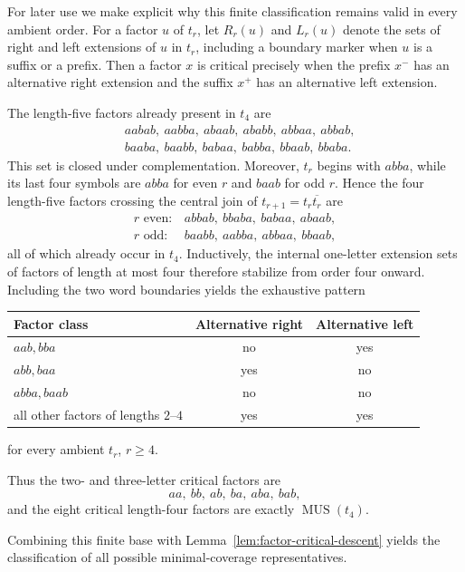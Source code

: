 \documentclass[10pt,a4paper]{article}
\theoremstyle{definition}\newtheorem{definition}[theorem]{Definition}
\theoremstyle{remark}\newtheorem{remark}[theorem]{Remark}
\newcommand{\MUS}{\operatorname{MUS}}
\begin{document}
For later use we make explicit why this finite classification remains valid in every ambient order.  For a factor $u$ of $t_r$, let $R_r(u)$ and $L_r(u)$ denote the sets of right and left extensions of $u$ in $t_r$, including a boundary marker when $u$ is a suffix or a prefix.  Then a factor $x$ is critical precisely when the prefix $x^-$ has an alternative right extension and the suffix $x^+$ has an alternative left extension.

The length-five factors already present in $t_4$ are
\begin{align*}
 &aabab,\ aabba,\ abaab,\ ababb,\ abbaa,\ abbab,\\
 &baaba,\ baabb,\ babaa,\ babba,\ bbaab,\ bbaba.
\end{align*}
This set is closed under complementation.  Moreover, $t_r$ begins with $abba$, while its last four symbols are $abba$ for even $r$ and $baab$ for odd $r$.  Hence the four length-five factors crossing the central join of $t_{r+1}=t_r\overline{t_r}$ are
\[
 \begin{array}{ll}
 r\text{ even}:& abbab,\ bbaba,\ babaa,\ abaab,\\
 r\text{ odd}:& baabb,\ aabba,\ abbaa,\ bbaab,
 \end{array}
\]
all of which already occur in $t_4$.  Inductively, the internal one-letter extension sets of factors of length at most four therefore stabilize from order four onward.  Including the two word boundaries yields the exhaustive pattern
\begin{center}
\begin{tabular}{lcc}
\toprule
Factor class & Alternative right & Alternative left\\
\midrule
$aab,bba$ & no & yes\\
$abb,baa$ & yes & no\\
$abba,baab$ & no & no\\
all other factors of lengths $2$--$4$ & yes & yes\\
\bottomrule
\end{tabular}
\end{center}
for every ambient $t_r$, $r\ge4$.

Thus the two- and three-letter critical factors are
\[
 aa,\ bb,\ ab,\ ba,\ aba,\ bab,
\]
and the eight critical length-four factors are exactly $\MUS(t_4)$.

Combining this finite base with Lemma~\ref{lem:factor-critical-descent} yields the classification of all possible minimal-coverage representatives.
\end{document}
